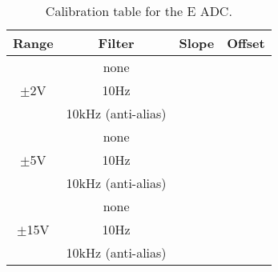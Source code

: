 \begin{table}[h]
\begin{center}
\begin{tabular}{|c|c|c|c|}
\hline
Range					&Filter				&Slope	&Offset\\
\hline \hline

\multirow{3}{*}{$\pm$2V}		&none				&		&\\  
\hhline{~---}
						&10Hz				&		&\\
\hhline{~---}
						&10kHz (anti-alias)	&		&\\
\hline \hline				

\multirow{3}{*}{$\pm$5V}		&none				&		&\\  
\hhline{~---}
						&10Hz				&		&\\
\hhline{~---}	
						&10kHz (anti-alias)	&		&\\
\hline \hline

\multirow{3}{*}{$\pm$15V}		&none		&\cellcolor[gray]{.8}	&\cellcolor[gray]{.8}\\  
\hhline{~---}
						&10Hz				&\cellcolor[gray]{.8}	&\cellcolor[gray]{.8}\\
\hhline{~---}
						&10kHz (anti-alias)	&\cellcolor[gray]{.8}	&\cellcolor[gray]{.8}\\
\hline


\end{tabular}
\caption{Calibration table for the E ADC.\label{vm_adc_cal_table}}
\end{center}
\end{table}
